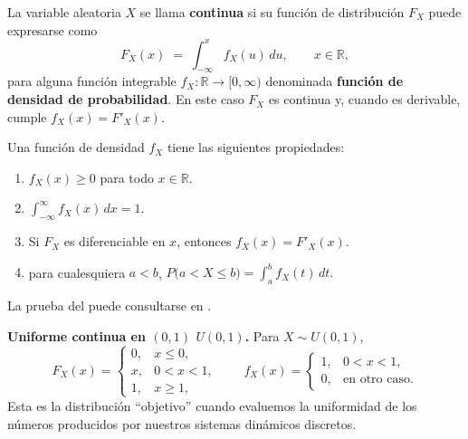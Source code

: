 \documentclass[../Main.tex]{subfiles}
\begin{document}
\begin{definition}
\label{}
La variable aleatoria $X$ se llama \textbf{continua} si su función de
distribución $F_X$ puede expresarse como
\[
    F_X(x)\;=\;\int_{-\infty}^{x} f_X(u)\,du,
    \qquad x\in\mathbb R,
\]
para alguna función integrable
$f_X:\mathbb R\to[0,\infty)$
denominada \textbf{función de densidad de probabilidad}. 
En este caso $F_X$ es continua y, cuando es derivable,
cumple $f_X(x)=F'_X(x)$.
\end{definition}

\begin{lemma}
\label{lemma:dens}
Una función de densidad \(f_X\) tiene las siguientes propiedades:
\begin{enumerate}
    \item \(f_X(x)\ge 0\) para todo \(x\in\mathbb R\).
    \item \(\displaystyle \int_{-\infty}^{\infty} f_X(x)\,dx = 1\).
    \item Si \(F_X\) es diferenciable en \(x\), entonces
          \(f_X(x)=F'_X(x)\).
    \item para cualesquiera $a<b$,
\(
    P\bigl(a<X\le b\bigr)=\int_{a}^{b} f_X(t)\,dt.
\)
\end{enumerate}
\end{lemma}
La prueba del  puede consultarse en \cite{grimmett2001probability}.


\begin{example}
\label{}
 \textbf{Uniforme continua en \((0,1)\) \(U(0,1)\).}  
          Para \(X\sim U(0,1)\),
          \[
              F_X(x)=
              \begin{cases}
                  0, & x\le 0,\\[4pt]
                  x, & 0<x<1,\\[4pt]
                  1, & x\ge 1,
              \end{cases}
              \qquad
              f_X(x)=
              \begin{cases}
                  1, & 0<x<1,\\[4pt]
                  0, & \text{en otro caso.}
              \end{cases}
          \]
          Esta es la distribución “objetivo” cuando evaluemos la uniformidad
          de los números producidos por nuestros sistemas dinámicos discretos.
\end{example}
\end{document}
